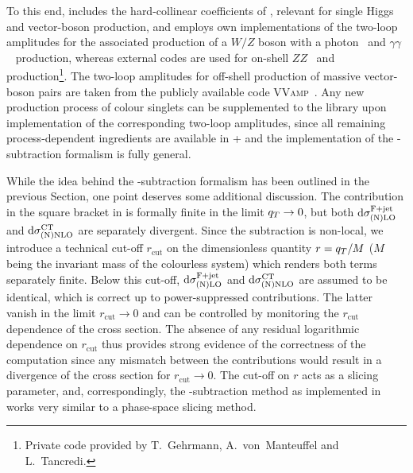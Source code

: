 \documentclass[english,11pt]{article}
\begin{document}
To this end, \Matrix{} includes the hard-collinear coefficients of , relevant for single Higgs and vector-boson production, and employs own implementations of the two-loop amplitudes
for the associated production of a $W/Z$ boson with a photon~\cite{Gehrmann:2011ab} and $\gamma\gamma$~\cite{Anastasiou:2002zn}  production, whereas external codes are used for on-shell 
$ZZ$~\cite{Cascioli:2014yka} and \ww{}~\cite{Gehrmann:2014fva} production\footnote{Private code provided by T.~Gehrmann, A.~von~Manteuffel and L.~Tancredi.}. 
The two-loop amplitudes for off-shell production of massive vector-boson pairs\cite{Gehrmann:2015ora} are taken from the publicly 
available code \textsc{VVamp}~\cite{hepforge:VVamp}.
Any new production process of colour singlets can be supplemented to the \Matrix{} library upon implementation 
of the corresponding two-loop amplitudes, since all remaining process-dependent ingredients are available
in \Munich{}+\OpenLoops{} and the implementation of the \qt{}-subtraction formalism is fully general.


While the idea behind the \qt{}-subtraction formalism has been outlined in the
previous Section, one point deserves some additional discussion.
The contribution in the square bracket in  is formally finite in the limit $q_T\to 0$,
but both $\mathrm{d}{\sigma}^{\mathrm{F + jet}}_{\mathrm{(N)LO}}$ and $\mathrm{d}{\sigma}^{\mathrm{CT}}_{\mathrm{(N)NLO}}$
are separately divergent. Since the subtraction is non-local,
we introduce a technical cut-off $r_{\mathrm{cut}}$ on the dimensionless quantity $r=q_T/M$ ($M$ being the invariant mass of the colourless system) which renders both terms separately finite. Below this cut-off, $\mathrm{d}{\sigma}^{\mathrm{F + jet}}_{\mathrm{(N)LO}}$ 
and $\mathrm{d}{\sigma}^{\mathrm{CT}}_{\mathrm{(N)NLO}}$ are assumed to be identical, which is correct up to power-suppressed contributions.
The latter vanish in the limit $r_{\mathrm{cut}}\to0$ and can be controlled by monitoring the $r_{\mathrm{cut}}$ dependence of the cross section.
The absence of any residual logarithmic dependence on $r_{\mathrm{cut}}$ thus provides strong evidence of the correctness of the 
computation since any mismatch between the contributions would result in a divergence of the cross section for $r_{\mathrm{cut}}\to0$.
The cut-off on $r$ acts as a slicing parameter, and, correspondingly, the \qt{}-subtraction method as implemented in \Matrix{} works 
very similar to a phase-space slicing method. 
\end{document}
